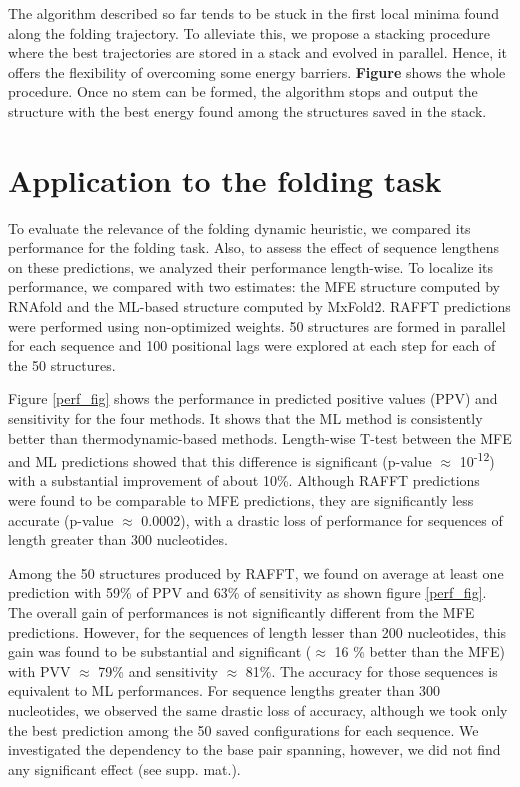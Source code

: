 \documentclass[a4paper,12pt]{article}
\begin{document}
{{The algorithm described so far tends to be stuck in the first local minima found
along the folding trajectory. To alleviate this, we propose a stacking procedure
where the best trajectories are stored in a stack and evolved in parallel.
Hence, it offers the flexibility of overcoming some energy barriers. \textbf{Figure}
shows the whole procedure. Once no stem can be formed, the algorithm stops and
output the structure with the best energy found among the structures saved in
the stack.

\section{Application to the folding task}
\label{sec:org99c9fb1}
To evaluate the relevance of the folding dynamic heuristic, we compared its
performance for the folding task. Also, to assess the effect of sequence
lengthens on these predictions, we analyzed their performance length-wise. To
localize its performance, we compared with two estimates: the MFE structure
computed by RNAfold and the ML-based structure computed by MxFold2. RAFFT
predictions were performed using non-optimized weights. 50 structures are formed
in parallel for each sequence and 100 positional lags were explored at each step
for each of the 50 structures.

Figure \ref{perf_fig} shows the performance in predicted positive values (PPV) and
sensitivity for the four methods. It shows that the ML method is consistently
better than thermodynamic-based methods. Length-wise T-test between the MFE and
ML predictions showed that this difference is significant (p-value \(\approx\)
10\textsuperscript{-12}) with a substantial improvement of about 10\%. Although RAFFT
predictions were found to be comparable to MFE predictions, they are
significantly less accurate (p-value \(\approx\) 0.0002), with a drastic loss of
performance for sequences of length greater than 300 nucleotides.

Among the 50 structures produced by RAFFT, we found on average at least one
prediction with 59\% of PPV and 63\% of sensitivity as shown figure \ref{perf_fig}.
The overall gain of performances is not significantly different from the MFE
predictions. However, for the sequences of length lesser than 200 nucleotides,
this gain was found to be substantial and significant (\(\approx\) 16 \% better than
the MFE) with PVV \(\approx\) 79\% and sensitivity \(\approx\) 81\%. The accuracy for
those sequences is equivalent to ML performances. For sequence lengths greater
than 300 nucleotides, we observed the same drastic loss of accuracy, although we
took only the best prediction among the 50 saved configurations for each
sequence. We investigated the dependency to the base pair spanning, however, we
did not find any significant effect (see supp. mat.).

}}
\end{document}
